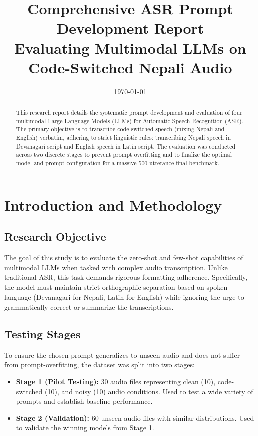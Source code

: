 \documentclass[12pt]{article}
\title{\textbf{Comprehensive ASR Prompt Development Report}\\ \Large Evaluating Multimodal LLMs on Code-Switched Nepali Audio}
\author{}
\date{\today}
\begin{document}
\maketitle
\begin{abstract}
This research report details the systematic prompt development and evaluation of four multimodal Large Language Models (LLMs) for Automatic Speech Recognition (ASR). The primary objective is to transcribe code-switched speech (mixing Nepali and English) verbatim, adhering to strict linguistic rules: transcribing Nepali speech in Devanagari script and English speech in Latin script. The evaluation was conducted across two discrete stages to prevent prompt overfitting and to finalize the optimal model and prompt configuration for a massive 500-utterance final benchmark.
\end{abstract}

\section{Introduction and Methodology}

\subsection{Research Objective}
The goal of this study is to evaluate the zero-shot and few-shot capabilities of multimodal LLMs when tasked with complex audio transcription. Unlike traditional ASR, this task demands rigorous formatting adherence. Specifically, the model must maintain strict orthographic separation based on spoken language (Devanagari for Nepali, Latin for English) while ignoring the urge to grammatically correct or summarize the transcriptions.

\subsection{Testing Stages}
To ensure the chosen prompt generalizes to unseen audio and does not suffer from prompt-overfitting, the dataset was split into two stages:
\begin{itemize}
    \item \textbf{Stage 1 (Pilot Testing):} 30 audio files representing clean (10), code-switched (10), and noisy (10) audio conditions. Used to test a wide variety of prompts and establish baseline performance.
    \item \textbf{Stage 2 (Validation):} 60 unseen audio files with similar distributions. Used to validate the winning models from Stage 1.
\end{itemize}
\end{document}
